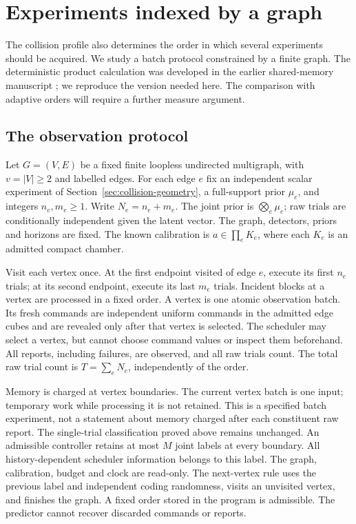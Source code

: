 \section{Experiments indexed by a graph}\label{sec:v25-graph}
The collision profile also determines the order in which several
experiments should be acquired. We study a batch protocol constrained
by a finite graph. The deterministic product calculation was developed
in the earlier shared-memory manuscript \cite{QiSharedMemory2026}; we
reproduce the version needed here. The comparison with adaptive orders
will require a further measure argument.

\subsection{The observation protocol}
Let $G=(V,E)$ be a fixed finite loopless undirected multigraph, with
$v=|V|\ge2$ and labelled edges. For each edge $e$ fix an independent
scalar experiment of Section~\ref{sec:collision-geometry}, a full-support
prior $\mu_e$, and integers $n_e,m_e\ge1$. Write $N_e=n_e+m_e$.
The joint prior is $\bigotimes_e\mu_e$; raw trials are conditionally
independent given the latent vector. The graph, detectors, priors and
horizons are fixed. The known calibration is
$a\in\prod_eK_e$, where each $K_e$ is an admitted compact chamber.

Visit each vertex once. At the first endpoint visited of edge $e$,
execute its first $n_e$ trials; at its second endpoint, execute its
last $m_e$ trials. Incident blocks at a vertex are processed in a fixed
order. A vertex is one atomic observation batch. Its fresh commands
are independent uniform commands in the admitted edge cubes and are
revealed only after that vertex is selected. The scheduler may select
a vertex, but cannot choose command values or inspect them beforehand.
All reports, including failures, are observed, and all raw trials count.
The total raw trial count is $T=\sum_eN_e$, independently of the order.

Memory is charged at vertex boundaries. The current vertex batch is
one input; temporary work while processing it is not retained. This is
a specified batch experiment, not a statement about memory charged
after each constituent raw report. The single-trial classification
proved above remains unchanged. An admissible controller retains at
most $M$ joint labels at every boundary. All history-dependent scheduler
information belongs to this label. The graph, calibration, budget and
clock are read-only. The next-vertex rule uses the previous label and
independent coding randomness, visits an unvisited vertex, and finishes
the graph. A fixed order stored in the program is admissible. The
predictor cannot recover discarded commands or reports.


